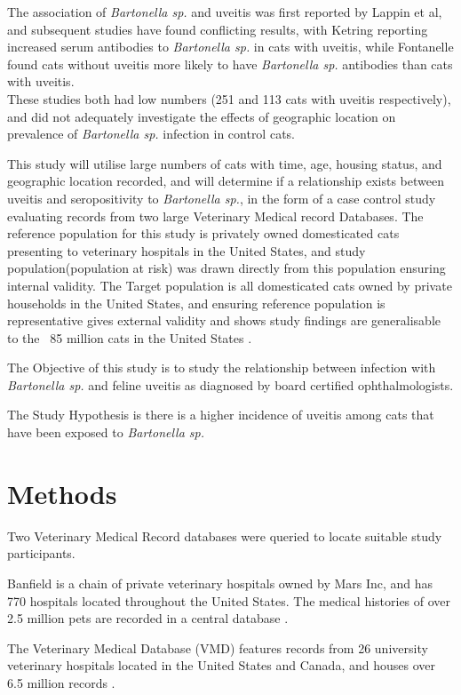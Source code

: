 \documentclass[11pt,twocolumn]{article}
\begin{document}
		The association of \emph{Bartonella sp.} and uveitis was first reported by Lappin et al\cite{Lappin1999}, and subsequent studies have found conflicting results, with Ketring reporting increased serum antibodies to \emph{Bartonella sp.} in cats with uveitis\cite{Ketring2004}, while Fontanelle found cats without uveitis more likely to have \emph{Bartonella sp.} antibodies than cats with uveitis.\\
		These studies both had low numbers (251 and 113 cats with uveitis respectively), and did not adequately investigate the effects of geographic location on prevalence of \emph{Bartonella sp.} infection in control cats.
	
		This study will utilise large numbers of cats with time, age, housing status, and geographic location recorded, and will determine if a relationship exists between uveitis and seropositivity to  \emph{Bartonella sp.}, in the form of a case control study evaluating records from two large Veterinary Medical record Databases. \cite{bark12,UniversityVeterinary}	
		The reference population for this study is privately owned domesticated cats presenting to veterinary hospitals in the United States, and study population(population at risk)  was drawn directly from this population ensuring internal validity.
		The Target population is all domesticated cats owned by private households in the United States, and ensuring reference population is representative gives external validity and shows study findings are generalisable to the ~85 million cats in the United States \cite{HSUSown}.
		

			The Objective of this study is to study the relationship between infection with \emph{Bartonella sp.} and feline uveitis as diagnosed by board certified ophthalmologists.


			The Study Hypothesis is there is a higher incidence of uveitis among cats that have been exposed to \emph{Bartonella sp.}
\section{Methods}
	Two Veterinary Medical Record databases were queried to locate suitable study participants.


	Banfield is a chain of private veterinary hospitals owned by Mars Inc, and has 770 hospitals located throughout the United States.
	The medical histories of over 2.5 million pets are recorded in a central database \cite{bark12}.


	The Veterinary Medical Database (VMD) features records from 26 university veterinary hospitals located in the United States and Canada, and houses over 6.5 million records \cite{UniversityVeterinary}.
	
\end{document}
